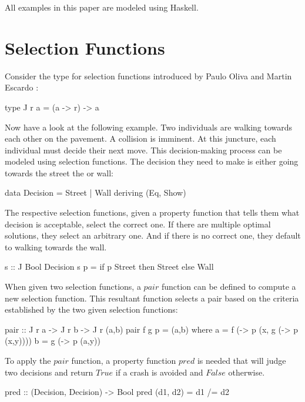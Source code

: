 \documentclass[runningheads]{llncs}
\begin{document}
\qquad All examples in this paper are modeled using Haskell.

\section{Selection Functions}\label{selection-functions}

Consider the type for selection functions introduced by Paulo Oliva and
Martin Escardo \cite{escardo2010selection} :

\begin{code}
type J r a = (a -> r) -> a
\end{code}

Now have a look at the following example. Two individuals are walking
towards each other on the pavement. A collision is imminent. At this
juncture, each individual must decide their next move. This
decision-making process can be modeled using selection functions. The
decision they need to make is either going towards the street the or
wall:

\begin{code}
data Decision = Street | Wall deriving (Eq, Show)
\end{code}

The respective selection functions, given a property function that tells
them what decision is acceptable, select the correct one. If there are
multiple optimal solutions, they select an arbitrary one. And if there
is no correct one, they default to walking towards the wall.

\begin{code}
s :: J Bool Decision
s p = if p Street then Street else Wall
\end{code}

When given two selection functions, a \(pair\) function can be defined
to compute a new selection function. This resultant function selects a
pair based on the criteria established by the two given selection
functions: \newpage

\begin{code}
pair :: J r a -> J r b -> J r (a,b)
pair f g p = (a,b)
  where
      a = f (\x -> p (x, g (\y -> p (x,y))))
      b = g (\y -> p (a,y))
\end{code}

To apply the \(pair\) function, a property function \(pred\) is needed
that will judge two decisions and return \(True\) if a crash is avoided
and \(False\) otherwise.

\begin{code}
pred :: (Decision, Decision) -> Bool
pred (d1, d2) = d1 /= d2
\end{code}
\end{document}

